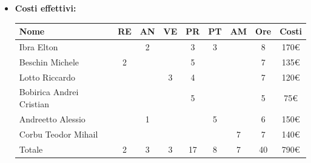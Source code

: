 \begin{itemize}
\begin{longtable}{|c|c|c|c|}
        \hline
        \end{longtable}
    \item \textbf{Costi effettivi:}
    \begin{longtable}{|p{}|c|c|c|c|c|c|c|c|}
        \hline
        Nome & RE & AN & VE & PR & PT & AM & Ore & Costi\\
        \hline
        Ibra \newline Elton & &2 & &3 &3 & &8 & 170€\\
        \hline
        Beschin Michele &2 & & &5 & & &7 & 135€\\
        \hline
        Lotto \newline Riccardo & & &3 &4 & & &7 & 120€\\
        \hline
        Bobirica Andrei Cristian & & & &5 & & &5 & 75€\\
        \hline
        Andreetto Alessio & &1 & & &5 & &6 & 150€\\
        \hline
        Corbu Teodor Mihail & & & & & &7 &7 & 140€\\
        \hline
        Totale &2 &3 &3 &17 &8 &7 &40 & 790€\\
        \hline
    \end{longtable}
    \end{itemize}